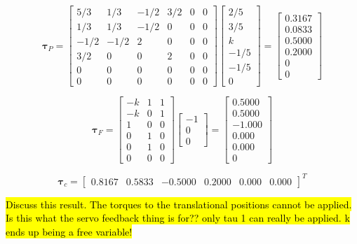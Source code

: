 \begin{equation}
    \boldsymbol{\tau}_P = 
    \begin{bmatrix}
        5/3 & 1/3 & -1/2 & 3/2 & 0 & 0 \\
        1/3 & 1/3 & -1/2 & 0 & 0 & 0 \\
        -1/2 & -1/2 & 2 & 0 & 0 & 0 \\
        3/2 & 0 & 0 & 2 & 0 & 0 \\
        0 & 0 & 0 & 0 & 0  & 0\\
        0 & 0 & 0 & 0 & 0  & 0
    \end{bmatrix}
    \begin{bmatrix}
        2/5\\
        3/5\\
        k \\
        -1/5\\
        -1/5\\0
    \end{bmatrix}=
    \begin{bmatrix}
        0.3167\\
        0.0833\\
        0.5000 \\
        0.2000\\
        0\\0
    \end{bmatrix}
\end{equation}

\begin{equation}
    \boldsymbol{\tau}_F = 
    \begin{bmatrix}
       -k & 1 & 1\\
       -k & 0 & 1\\
       1 & 0 & 0\\
       0 & 1 & 0\\
       0 & 1 & 0 \\
       0 & 0 & 0
    \end{bmatrix}
    \begin{bmatrix}
        -1 \\ 0 \\ 0
    \end{bmatrix}=
    \begin{bmatrix}
       0.5000\\
       0.5000\\
       -1.000\\
       0.000\\
       0.000\\ 0
    \end{bmatrix}
\end{equation}

\begin{equation}
    \boldsymbol{\tau}_c =
    \begin{bmatrix}
        0.8167 & 0.5833 & -0.5000 & 0.2000 & 0.000 & 0.000
    \end{bmatrix}^T
\end{equation}

\hl{Discuss this result. The torques to the translational positions cannot be applied. Is this what the servo feedback thing is for?? only tau 1 can really be applied. k ends up being a free variable!}
